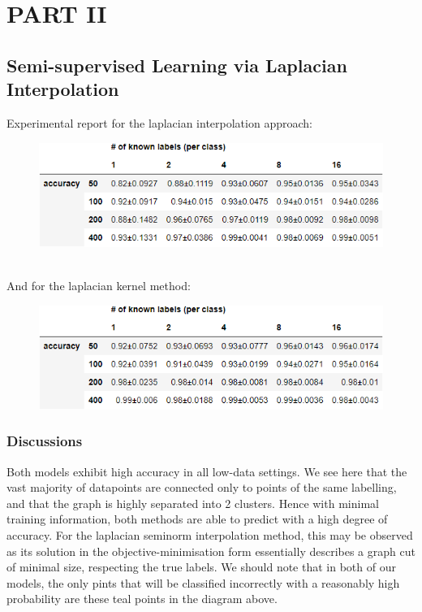 \documentclass[12pt]{article}
\begin{document}
\newpage
\section{PART II}
\subsection{Semi-supervised Learning via Laplacian Interpolation}

Experimental report for the laplacian interpolation approach:
\\
    \begin{figure}[h]
    \centering
    \includegraphics[scale=0.5]{outputs/part2/laplacian_interpolation_report.png}
    \caption{}
    \label{fig:12}
    \end{figure}

\\

And for the laplacian kernel method:
    \begin{figure}[h]
    \centering
    \includegraphics[scale=0.5]{outputs/part2/laplacian_kernel_interpolation_report.png}
    \caption{}
    \label{fig:13}
    \end{figure}

\subsubsection{Discussions}
Both models exhibit high accuracy in all low-data settings. We see here that the vast majority of datapoints are connected only to points
of the same labelling, and that the graph is highly separated into 2 clusters.
Hence with minimal training information, both methods are able to predict with a
high degree of accuracy. For the laplacian seminorm interpolation method, this may be observed 
as its solution in the objective-minimisation form essentially describes a graph cut of minimal size, respecting
the true labels. We should note that in both of our models, the only pints that will be classified incorrectly with a 
reasonably high probability are these teal points in the diagram above.\\
\end{document}
